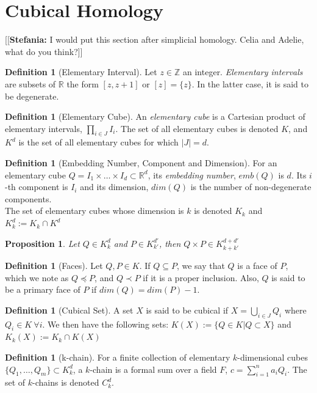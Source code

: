 \documentclass{article}
\newcommand{\R}{\mathbb{R}}
\newcommand{\Z}{\mathbb{Z}}
\newcommand{\ste}[1]{{\color{green}[[\textbf{Stefania: }#1]]}}
\theoremstyle{plain}
\newtheorem{prop}[thm]{Proposition}
\theoremstyle{definition}
\newtheorem{definition}[thm]{Definition}
\theoremstyle{remark}
\begin{document}
\section{Cubical Homology}
\ste{I would put this section after simplicial homology. Celia and Adelie, what do you think?}
\begin{definition}[Elementary Interval]
Let $z \in \Z$ an integer. \emph{Elementary intervals} are subsets of $\R$ the form $ [z,z+1] $ or $ [z]= \{z\} $. In the latter case, it is said to be degenerate.  
\end{definition}

\begin{definition}[Elementary Cube]
An \emph{elementary cube} is a Cartesian product of elementary intervals, $ \prod_{i\in J} I_i $. The set of all elementary cubes is denoted $K$, and $K^d$ is the set of all elementary cubes for which $|J| = d$.
\end{definition}

\begin{definition}[Embedding Number, Component and Dimension]
For an elementary cube $Q= I_1 \times \dots \times I_d \subset \R^d$, its \emph{embedding number}, $emb(Q)$ is $d$. Its $i$-th component is $I_i$ and its dimension, $dim(Q)$ is the number of non-degenerate components. \\
The set of elementary cubes whose dimension is $k$ is denoted $K_k$ and $K_k^d := K_k \cap K^d$
\end{definition}

\begin{prop}
Let $Q\in K_k^d$ and $P\in K_{k'}^{d'}$, then $Q \times P \in K_{k+k'}^{d+d'}$
\end{prop}

\begin{definition}[Faces]
Let $Q,P \in K$. If $Q\subseteq P$, we say that $Q$ is a face of $P$, which we note as $Q \preceq P$, and $Q \prec P$ if it is a proper inclusion. Also, $Q$ is said to be a primary face of $P$ if $dim(Q) = dim(P) - 1$.
\end{definition}

\begin{definition}[Cubical Set]
A set $X$ is said to be cubical if $X= \bigcup_{i\in J} Q_i $ where $Q_i \in K \ \forall i $. We then have the following sets: $K(X) := \{ Q \in K | Q \subset X \}$ and $K_k(X) := K_k \cap K(X)$
\end{definition}

\begin{definition}[k-chain]
For a finite collection of elementary $k$-dimensional cubes $\{ Q_1, \dots , Q_m \} \subset K_k^d$, a $k$-chain is a formal sum over a field $F$, $c=\sum_{i=1}^n a_i Q_i$. The set of $k$-chains is denoted $C_k^d$.
\end{definition}
\end{document}
